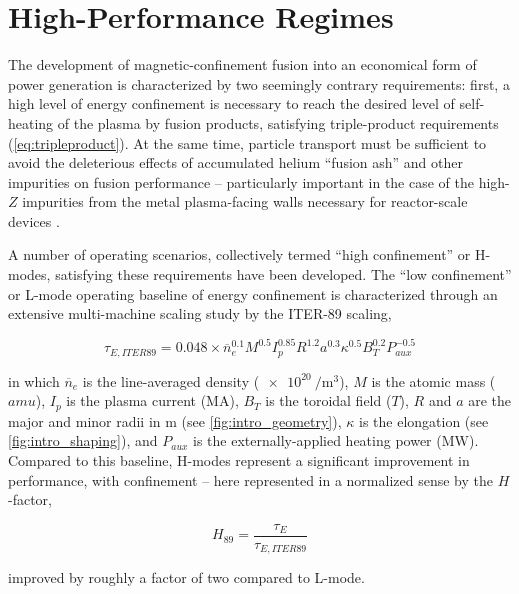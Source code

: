 \chapter{High-Performance Regimes}\label{ch:HighPerformance}

The development of magnetic-confinement fusion into an economical form of power generation is characterized by two seemingly contrary requirements: first, a high level of energy confinement is necessary to reach the desired level of self-heating of the plasma by fusion products, satisfying triple-product requirements (\cref{eq:tripleproduct}).  At the same time, particle transport must be sufficient to avoid the deleterious effects of accumulated helium ``fusion ash'' and other impurities on fusion performance -- particularly important in the case of the high-$Z$ impurities from the metal plasma-facing walls necessary for reactor-scale devices \cite{Loarte2007}.

A number of operating scenarios, collectively termed ``high confinement'' or H-modes\cite{Wagner1982,Keilhacker1984}, satisfying these requirements have been developed.  The ``low confinement'' or L-mode operating baseline of energy confinement is characterized through an extensive multi-machine scaling study \cite{Yushmanov1990} by the ITER-89 scaling,

\begin{equation}\label{eq:tau89}
 \tau_{E,ITER89} = 0.048 \times \overline{n}_e^{0.1} M^{0.5} I_p^{0.85} R^{1.2} a^{0.3} \kappa^{0.5} B_T^{0.2} P_{aux}^{-0.5}
\end{equation}

\noindent in which $\overline{n}_e$ is the line-averaged density ($\SI{e20}{\per\meter\cubed}$), $M$ is the atomic mass ($\si{amu}$), $I_p$ is the plasma current ($\si{\mega\ampere}$), $B_T$ is the toroidal field ($\si{T}$), $R$ and $a$ are the major and minor radii in $\si{\meter}$ (see \cref{fig:intro_geometry}), $\kappa$ is the elongation (see \cref{fig:intro_shaping}), and $P_{aux}$ is the externally-applied heating power ($\si{\mega\watt}$).  Compared to this baseline, H-modes represent a significant improvement in performance, with confinement -- here represented in a normalized sense by the $H$-factor, \ie

\begin{equation}\label{eq:H89}
 H_{89} = \frac{\tau_E}{\tau_{E,ITER89}}
\end{equation}

\noindent improved by roughly a factor of two compared to L-mode.

